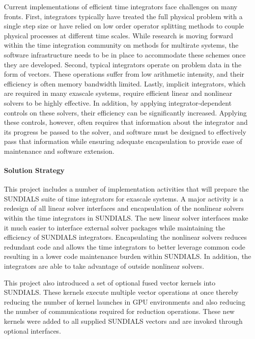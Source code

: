 Current implementations of efficient time integrators face challenges on many fronts.  First, integrators typically have treated the full physical problem with a single step size or have relied on low order operator splitting methods to couple physical processes at different time scales. While research is moving forward within the time integration community on methods for multirate systems, the software infrastructure needs to be in place to accommodate these schemes once they are developed.   Second, typical integrators operate on problem data in the form of vectors.  These operations suffer from low arithmetic intensity, and their efficiency is often memory bandwidth limited.  Lastly, implicit integrators, which are required in many exascale systems, require efficient linear and nonlinear solvers to be highly effective.  In addition, by applying integrator-dependent controls on these solvers, their efficiency can be significantly increased.  Applying these controls, however, often requires that information about the integrator and its progress be passed to the solver, and software must be designed to effectively pass that information while ensuring adequate encapsulation to provide ease of maintenance and software extension.

\paragraph{Solution Strategy}

This project includes a number of implementation activities that will prepare the SUNDIALS suite of time integrators for exascale systems. A major activity is a redesign of all linear solver interfaces and encapsulation of the nonlinear solvers within the time integrators in SUNDIALS.  The new linear solver interfaces make it much easier to interface external solver packages while maintaining the efficiency of SUNDIALS integrators. Encapsulating the nonlinear solvers reduces redundant code and allows the time integrators to better leverage common code resulting in a lower code maintenance burden within SUNDIALS.  In addition, the integrators are able to take advantage of outside nonlinear solvers.  

This project also introduced a set of optional fused vector kernels into SUNDIALS.  These kernels execute multiple vector operations at once thereby reducing the number of kernel launches in GPU environments and also reducing the number of communications required for reduction operations.  These new kernels were added to all supplied SUNDIALS vectors and are invoked through optional interfaces.


